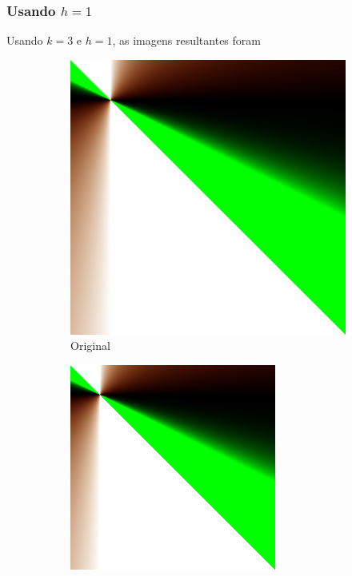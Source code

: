 \documentclass{article}
\begin{document}
\subsubsection[Usando h=1]{Usando $h=1$}

Usando $k=3$ e $h=1$, as imagens resultantes foram

\begin{figure}[ht]
  \centering
  \begin{subfigure}{0.23\textwidth}
    \centering
    \includegraphics[width=\textwidth]{polinomial/polinomial.png}
    \caption{Original}
  \end{subfigure}%
  \hfill
  \begin{subfigure}{0.23\textwidth}
    \centering
    \includegraphics[width=\textwidth]{polinomial/h-1/compressed.png}

\end{subfigure}
\end{figure}
\end{document}
